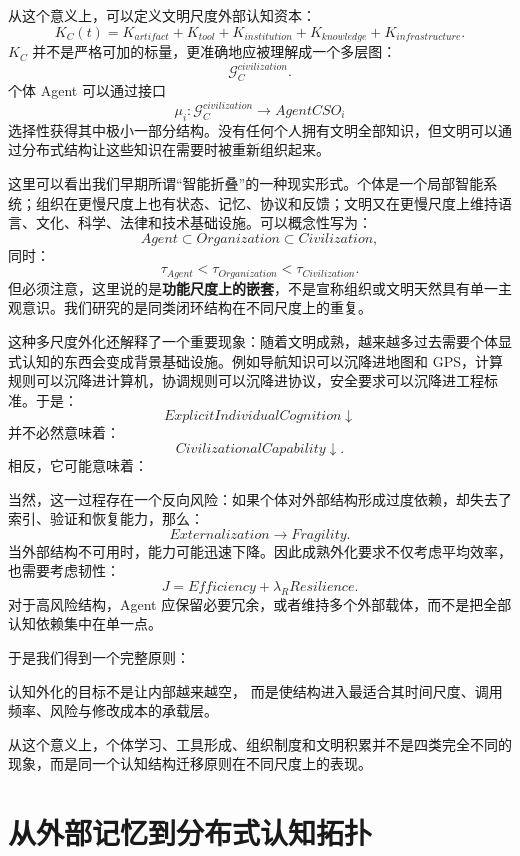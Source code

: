 从这个意义上，可以定义文明尺度外部认知资本：
\[
K_C(t)
=
K_{artifact}
+
K_{tool}
+
K_{institution}
+
K_{knowledge}
+
K_{infrastructure}.
\]
$K_C$ 并不是严格可加的标量，更准确地应被理解成一个多层图：
\[
\mathcal G_C^{civilization}.
\]
个体 Agent 可以通过接口
\[
\mu_i:
\mathcal G_C^{civilization}
\rightarrow
AgentCSO_i
\]
选择性获得其中极小一部分结构。没有任何个人拥有文明全部知识，但文明可以通过分布式结构让这些知识在需要时被重新组织起来。

这里可以看出我们早期所谓``智能折叠''的一种现实形式。个体是一个局部智能系统；组织在更慢尺度上也有状态、记忆、协议和反馈；文明又在更慢尺度上维持语言、文化、科学、法律和技术基础设施。可以概念性写为：
\[
Agent
\subset
Organization
\subset
Civilization,
\]
同时：
\[
\tau_{Agent}
<
\tau_{Organization}
<
\tau_{Civilization}.
\]
但必须注意，这里说的是\textbf{功能尺度上的嵌套}，不是宣称组织或文明天然具有单一主观意识。我们研究的是同类闭环结构在不同尺度上的重复。

这种多尺度外化还解释了一个重要现象：随着文明成熟，越来越多过去需要个体显式认知的东西会变成背景基础设施。例如导航知识可以沉降进地图和 GPS，计算规则可以沉降进计算机，协调规则可以沉降进协议，安全要求可以沉降进工程标准。于是：
\[
ExplicitIndividualCognition
\downarrow
\]
并不必然意味着：
\[
CivilizationalCapability
\downarrow.
\]
相反，它可能意味着：
\begin{statementbox}
\centering
{}
\end{statementbox}

当然，这一过程存在一个反向风险：如果个体对外部结构形成过度依赖，却失去了索引、验证和恢复能力，那么：
\[
Externalization
\rightarrow
Fragility.
\]
当外部结构不可用时，能力可能迅速下降。因此成熟外化要求不仅考虑平均效率，也需要考虑韧性：
\[
J
=
Efficiency
+
\lambda_R Resilience.
\]
对于高风险结构，Agent 应保留必要冗余，或者维持多个外部载体，而不是把全部认知依赖集中在单一点。

于是我们得到一个完整原则：
\begin{proposition*}
认知外化的目标不是让内部越来越空，
而是使结构进入最适合其时间尺度、调用频率、风险与修改成本的承载层。
\end{proposition*}
从这个意义上，个体学习、工具形成、组织制度和文明积累并不是四类完全不同的现象，而是同一个认知结构迁移原则在不同尺度上的表现。

\section{从外部记忆到分布式认知拓扑}

